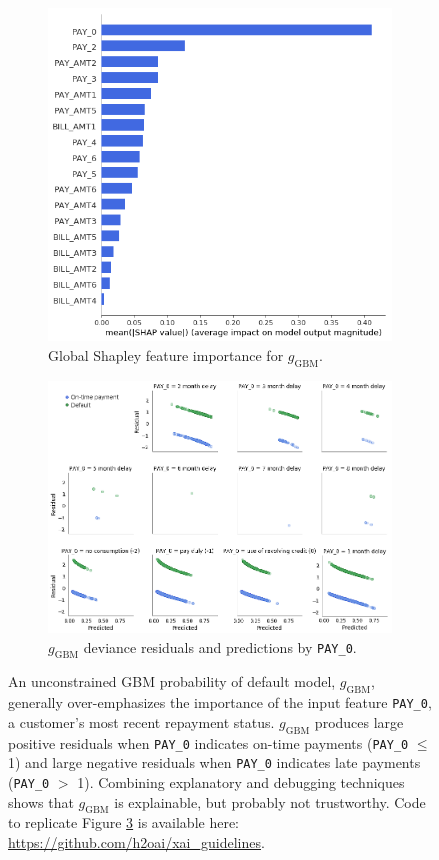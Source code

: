 \documentclass[sigconf]{acmart}
\begin{document}
\begin{figure}[htb!]
	\begin{subfigure}{.4\textwidth} \centering
  		\includegraphics[height=0.8\linewidth, width=0.75\linewidth]{img/global_shap.png}
  		\caption{Global Shapley feature importance for $g_{\text{GBM}}$.}
  		\label{fig:global_shap}
	\end{subfigure}
	\begin{subfigure}{.5\textwidth} \centering
		\vspace{5pt}\includegraphics[width=0.85\linewidth]{img/resid.png}
  		\caption{$g_{\text{GBM}}$ deviance residuals and predictions by \texttt{PAY\_0}.}
  		\label{fig:resid}
	\end{subfigure}
	\vspace{-8pt}
	\caption{An unconstrained GBM probability of default model, $g_{\text{GBM}}$, generally over-emphasizes the importance of the input feature \texttt{PAY\_0}, a customer's most recent repayment status. $g_{\text{GBM}}$ produces large positive residuals when \texttt{PAY\_0} indicates on-time payments (\texttt{PAY\_0} $\leq$ 1) and large negative residuals when \texttt{PAY\_0} indicates late payments (\texttt{PAY\_0} $>$ 1). Combining explanatory and debugging techniques shows that $g_{\text{GBM}}$ is explainable, but probably not trustworthy. Code to replicate Figure \ref{fig:global_shap_resid} is available here: \url{https://github.com/h2oai/xai_guidelines}.} 
	\label{fig:global_shap_resid}
\end{figure}
\end{document}
